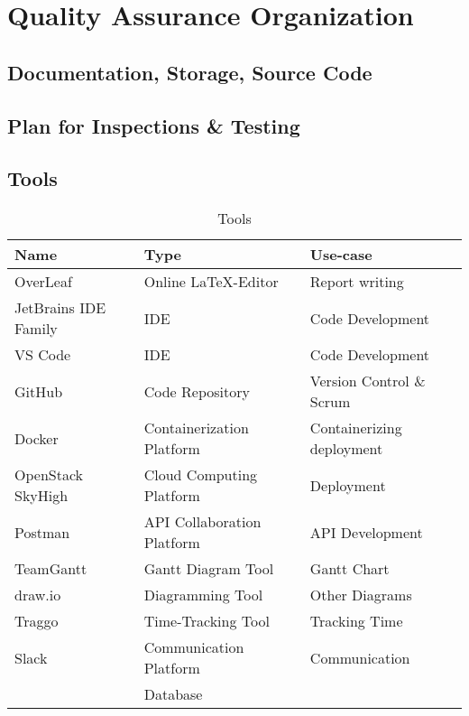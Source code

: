 \section{Quality Assurance Organization}

\subsection{Documentation, Storage, Source Code}

\begin{comment}
    Documentation
        Kode
            Følge industri-standard dokumentasjon og kodestil for hvert kodespråk
            Kanksje generere dokumetasjonssider fra kodedokumentasjon
        Misc dokumenter
            
        Møter og enigheter
            Møtenotater/referat skal bli tatt av alle møter
            Alle viktige valg som blir gjort etter diskusjoner blir notert
        
    Storage ?
        Skylagring (slack, google drive, w/e) med backup på en separat enhet, egen eller sky
        
\end{comment}

\subsection{Plan for Inspections \& Testing}

\subsection{Tools}

\begin{table} [H]
    \centering
    \begin{tabular}{|l|l|l|}
    \hline
    Name & Type & Use-case \\
    \hline
    OverLeaf & Online \LaTeX-Editor & Report writing \\
    JetBrains IDE Family & IDE & Code Development \\
    VS Code & IDE & Code Development \\
    GitHub & Code Repository & Version Control \& Scrum \\
    Docker & Containerization Platform & Containerizing deployment \\
    OpenStack SkyHigh & Cloud Computing Platform & Deployment \\
    Postman & API Collaboration Platform & API Development \\
    TeamGantt & Gantt Diagram Tool & Gantt Chart \\
    draw.io & Diagramming Tool & Other Diagrams \\
    Traggo & Time-Tracking Tool & Tracking Time \\
    Slack & Communication Platform & Communication \\
     & Database & \\
    \hline
    \end{tabular}
    \caption{Tools}
    \label{tab:tools}
\end{table}

